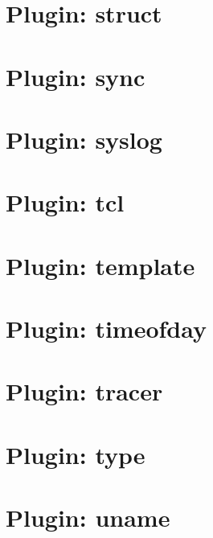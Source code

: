 \documentclass[twoside]{book}
\newcommand{\+}{\discretionary{\mbox{\scriptsize$\hookleftarrow$}}{}{}}
\begin{document}
\chapter{Plugin\+: struct}
\label{md_src_plugins_struct_README}
\hypertarget{md_src_plugins_struct_README}{}

\chapter{Plugin\+: sync}
\label{md_src_plugins_sync_README}
\hypertarget{md_src_plugins_sync_README}{}

\chapter{Plugin\+: syslog}
\label{md_src_plugins_syslog_README}
\hypertarget{md_src_plugins_syslog_README}{}

\chapter{Plugin\+: tcl}
\label{md_src_plugins_tcl_README}
\hypertarget{md_src_plugins_tcl_README}{}

\chapter{Plugin\+: template}
\label{md_src_plugins_template_README}
\hypertarget{md_src_plugins_template_README}{}

\chapter{Plugin\+: timeofday}
\label{md_src_plugins_timeofday_README}
\hypertarget{md_src_plugins_timeofday_README}{}

\chapter{Plugin\+: tracer}
\label{md_src_plugins_tracer_README}
\hypertarget{md_src_plugins_tracer_README}{}

\chapter{Plugin\+: type}
\label{md_src_plugins_type_README}
\hypertarget{md_src_plugins_type_README}{}

\chapter{Plugin\+: uname}
\label{md_src_plugins_uname_README}
\hypertarget{md_src_plugins_uname_README}{}

\end{document}
